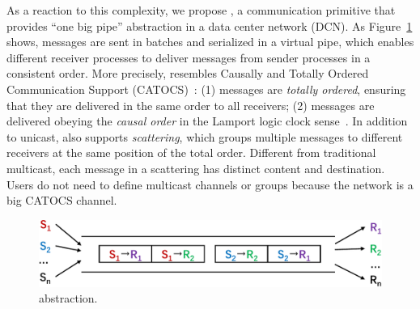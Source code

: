 



As a reaction to this complexity, we propose \sys{}, a communication primitive that provides ``one big pipe'' abstraction in a data center network (DCN). As Figure~\ref{fig:1pipe} shows, messages are sent in batches and serialized in a virtual pipe, which enables different receiver processes to deliver messages from sender processes in a consistent order.
More precisely, \sys{} resembles Causally and Totally Ordered Communication Support (CATOCS)~\cite{cheriton1994understanding}: (1) messages are \emph{totally ordered}, ensuring that they are delivered in the same order to all receivers; (2) messages are delivered obeying the \emph{causal order} in the Lamport logic clock sense~\cite{lamport1978time}. In addition to unicast, \sys{} also supports \emph{scattering}, which groups multiple messages to different receivers at the same position of the total order. Different from traditional multicast, each message in a scattering has distinct content and destination. Users do not need to define multicast channels or groups because the network is a big CATOCS channel.


\begin{figure}[t]
	\centering
	\includegraphics[width=.45\textwidth]{images/1pipe.pdf}
	\caption{\sys{} abstraction.}
	\label{fig:1pipe}
\end{figure}


